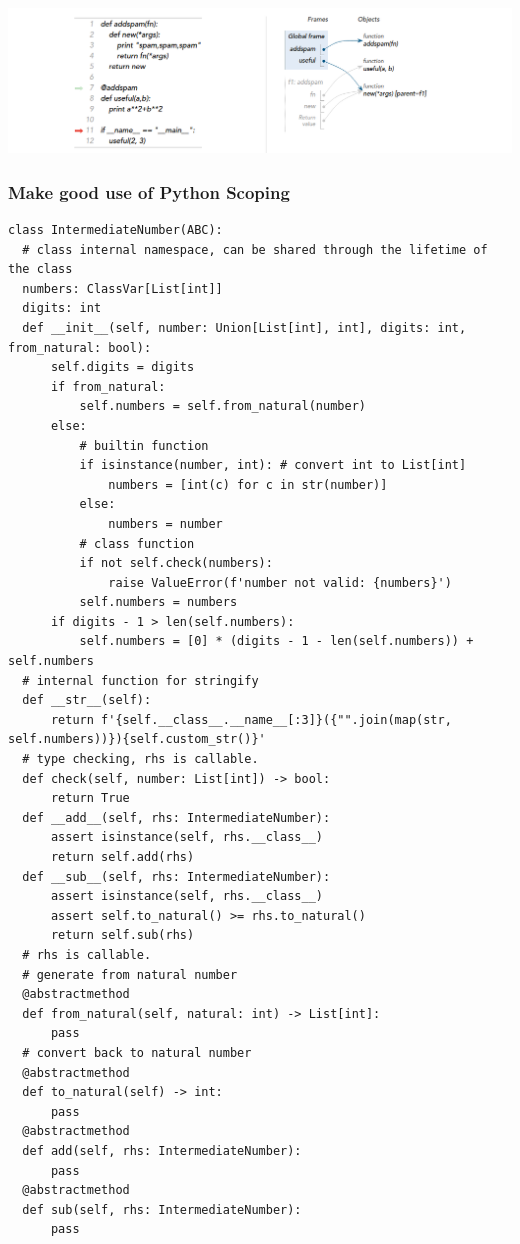 \documentclass[a4paper]{exam}
\begin{document}
\includegraphics[width=15cm]{./img/b5674ca16f72af11d7a1c70602fbfe10_b.png}



\subsubsection{Make good use of Python Scoping}
\begin{verbatim}
class IntermediateNumber(ABC):
  # class internal namespace, can be shared through the lifetime of the class
  numbers: ClassVar[List[int]]
  digits: int
  def __init__(self, number: Union[List[int], int], digits: int, from_natural: bool):
      self.digits = digits
      if from_natural:
          self.numbers = self.from_natural(number)
      else:
          # builtin function
          if isinstance(number, int): # convert int to List[int]
              numbers = [int(c) for c in str(number)]
          else:
              numbers = number
          # class function
          if not self.check(numbers):
              raise ValueError(f'number not valid: {numbers}')
          self.numbers = numbers
      if digits - 1 > len(self.numbers):
          self.numbers = [0] * (digits - 1 - len(self.numbers)) + self.numbers
  # internal function for stringify
  def __str__(self):
      return f'{self.__class__.__name__[:3]}({"".join(map(str, self.numbers))}){self.custom_str()}'
  # type checking, rhs is callable.
  def check(self, number: List[int]) -> bool:
      return True
  def __add__(self, rhs: IntermediateNumber):
      assert isinstance(self, rhs.__class__)
      return self.add(rhs)
  def __sub__(self, rhs: IntermediateNumber):
      assert isinstance(self, rhs.__class__)
      assert self.to_natural() >= rhs.to_natural()
      return self.sub(rhs)
  # rhs is callable.
  # generate from natural number
  @abstractmethod
  def from_natural(self, natural: int) -> List[int]:
      pass
  # convert back to natural number
  @abstractmethod
  def to_natural(self) -> int:
      pass
  @abstractmethod
  def add(self, rhs: IntermediateNumber):
      pass
  @abstractmethod
  def sub(self, rhs: IntermediateNumber):
      pass
\end{verbatim}
\end{document}
